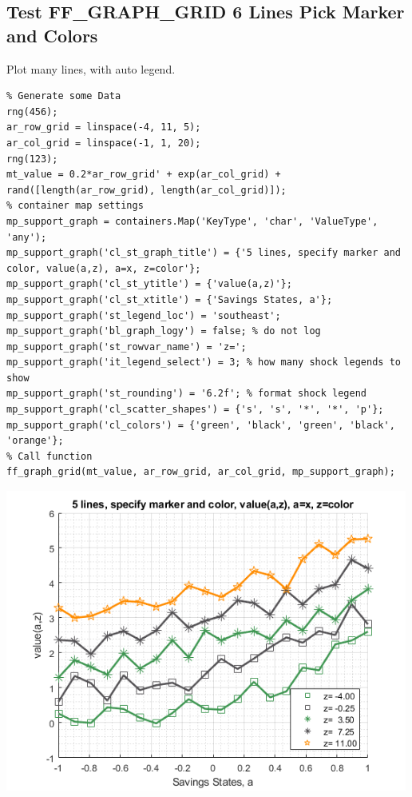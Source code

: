 \documentclass[
]{book}
\begin{document}
\hypertarget{test-ff_graph_grid-6-lines-pick-marker-and-colors}{%
\subsection{Test FF\_GRAPH\_GRID 6 Lines Pick Marker and Colors}\label{test-ff_graph_grid-6-lines-pick-marker-and-colors}}

Plot many lines, with auto legend.

\begin{verbatim}
% Generate some Data
rng(456);
ar_row_grid = linspace(-4, 11, 5);
ar_col_grid = linspace(-1, 1, 20);
rng(123);
mt_value = 0.2*ar_row_grid' + exp(ar_col_grid) + rand([length(ar_row_grid), length(ar_col_grid)]);
% container map settings
mp_support_graph = containers.Map('KeyType', 'char', 'ValueType', 'any');
mp_support_graph('cl_st_graph_title') = {'5 lines, specify marker and color, value(a,z), a=x, z=color'};
mp_support_graph('cl_st_ytitle') = {'value(a,z)'};
mp_support_graph('cl_st_xtitle') = {'Savings States, a'};
mp_support_graph('st_legend_loc') = 'southeast';
mp_support_graph('bl_graph_logy') = false; % do not log
mp_support_graph('st_rowvar_name') = 'z=';
mp_support_graph('it_legend_select') = 3; % how many shock legends to show
mp_support_graph('st_rounding') = '6.2f'; % format shock legend
mp_support_graph('cl_scatter_shapes') = {'s', 's', '*', '*', 'p'};
mp_support_graph('cl_colors') = {'green', 'black', 'green', 'black', 'orange'};
% Call function
ff_graph_grid(mt_value, ar_row_grid, ar_col_grid, mp_support_graph);
\end{verbatim}

\includegraphics[width=5.20833in,height=\textheight]{img/fx_graph_grid_images/figure_5.png}
\end{document}
